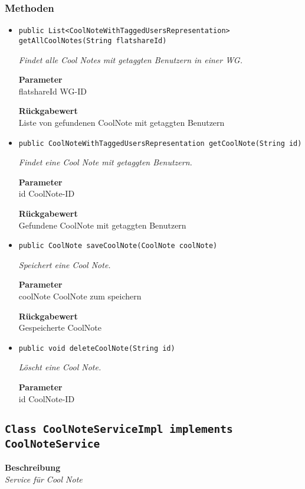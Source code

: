     \subsubsection{Methoden}
    \begin{itemize}
    	\item{\texttt{public List<CoolNoteWithTaggedUsersRepresentation> getAllCoolNotes(String flatshareId)}}
    	
    	\textit{Findet alle Cool Notes mit getaggten Benutzern in einer WG.}
    	
    	\textbf{Parameter} \\
    	flatshareId WG-ID
    	
    	\textbf{Rückgabewert} \\
    	Liste von gefundenen CoolNote mit getaggten Benutzern        \item{\texttt{public CoolNoteWithTaggedUsersRepresentation getCoolNote(String id)}}
    	
    	\textit{Findet eine Cool Note mit getaggten Benutzern.}
    	
    	\textbf{Parameter} \\
    	id CoolNote-ID
    	
    	\textbf{Rückgabewert} \\
    	Gefundene CoolNote mit getaggten Benutzern        \item{\texttt{public CoolNote saveCoolNote(CoolNote coolNote)}}
    	
    	\textit{Speichert eine Cool Note.}
    	
    	\textbf{Parameter} \\
    	coolNote CoolNote zum speichern
    	
    	\textbf{Rückgabewert} \\
    	Gespeicherte CoolNote        \item{\texttt{public void deleteCoolNote(String id)}}
    	
    	\textit{Löscht eine Cool Note.}
    	
    	\textbf{Parameter} \\
    	id CoolNote-ID
    	
    	
    \end{itemize}
    \subsection{\texttt{Class CoolNoteServiceImpl implements CoolNoteService}}
    \textbf{Beschreibung} \\
    \textit{Service für Cool Note}
